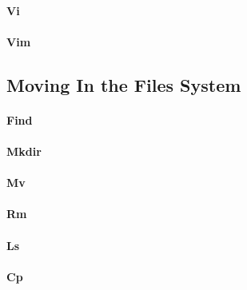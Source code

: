 \paragraph{Vi}
\paragraph{Vim}
\subsection{Moving In the Files System}
\paragraph{Find}
\paragraph{Mkdir}
\paragraph{Mv}
\paragraph{Rm}
\paragraph{Ls}
\paragraph{Cp}



